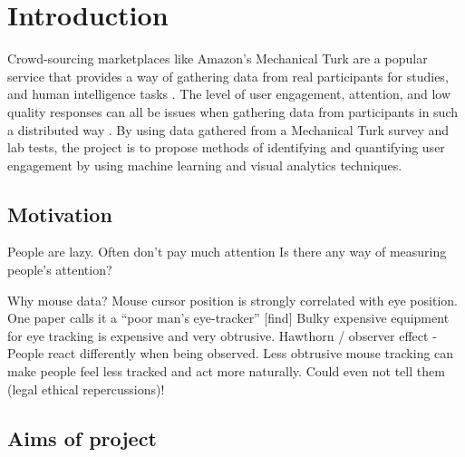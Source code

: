 \documentclass{article}
\begin{document}



\section{Introduction}

Crowd-sourcing marketplaces like Amazon’s Mechanical Turk are a popular service that provides a way of gathering data from real participants for studies, and human intelligence tasks \cite{paolacci2010running}. 
The level of user engagement, attention, and low quality responses can all be issues when gathering data from participants in such a distributed way \cite{ipeirotis2010quality}. 
By using data gathered from a Mechanical Turk survey and lab tests, the project is to propose methods of identifying and quantifying user engagement by using machine learning and visual analytics techniques.

\subsection{Motivation}



People are lazy. 
Often don't pay much attention 
Is there any way of measuring people's attention?

Why mouse data?
Mouse cursor position is strongly correlated with eye position. 
One paper calls it a “poor man's eye-tracker” [find]
Bulky expensive equipment for eye tracking is expensive and very obtrusive.
Hawthorn / observer effect - People react differently when being observed. 
Less obtrusive mouse tracking can make people feel less tracked and act more naturally. 
Could even not tell them (legal ethical repercussions)!

\subsection{Aims of project}
\end{document}
